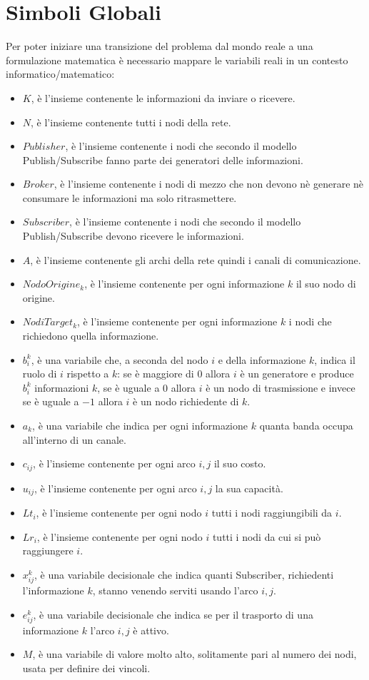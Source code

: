 \documentclass[12pt,a4paper,twoside]{report}
\begin{document}
	\section{Simboli Globali}
	Per poter iniziare una transizione del problema dal mondo reale a una formulazione matematica 
	è necessario mappare le variabili reali in un contesto informatico/matematico:
	\begin{itemize}
		\item $K$, è l'insieme contenente le informazioni da inviare o ricevere.
		\item $N$, è l'insieme contenente tutti i nodi della rete.
		\item $Publisher$, è l'insieme contenente i nodi che secondo il modello Publish/Subscribe fanno parte dei generatori delle informazioni.
		\item $Broker$, è l'insieme contenente i nodi di mezzo che non devono nè generare nè consumare le informazioni ma solo ritrasmettere.
		\item $Subscriber$, è l'insieme contenente i nodi che secondo il modello Publish/Subscribe devono ricevere le informazioni.
		\item $A$, è l'insieme contenente gli archi della rete quindi i canali di comunicazione.
		\item $NodoOrigine_k$, è l'insieme contenente per ogni informazione $k$ il suo nodo di origine.
		\item $NodiTarget_k$, è l'insieme contenente per ogni informazione $k$ i nodi che richiedono quella informazione.
		\item $b^k_i$, è una variabile che, a seconda del nodo $i$ e della informazione $k$, indica il ruolo di $i$ rispetto a $k$: se è maggiore di $0$ allora $i$ è un generatore e produce $b^k_i$ informazioni $k$, se è uguale a $0$ allora $i$ è un nodo di trasmissione e invece se è uguale a $-1$ allora $i$ è un nodo richiedente di $k$.
		\item $a_k$, è una variabile che indica per ogni informazione $k$ quanta banda occupa all'interno di un canale.
		\item $c_{ij}$, è l'insieme contenente per ogni arco $i,j$ il suo costo.
		\item $u_{ij}$, è l'insieme contenente per ogni arco $i,j$ la sua capacità.
		\item $Lt_i$, è l'insieme contenente per ogni nodo $i$ tutti i nodi raggiungibili da $i$.
		\item $Lr_i$, è l'insieme contenente per ogni nodo $i$ tutti i nodi da cui si può raggiungere $i$.
		\item $x^k_{ij}$, è una variabile decisionale che indica quanti Subscriber, richiedenti l'informazione $k$, stanno venendo serviti usando l'arco $i,j$.
		\item $e^k_{ij}$, è una variabile decisionale che indica se per il trasporto di una informazione $k$ l'arco $i,j$ è attivo.
		\item $M$, è una variabile di valore molto alto, solitamente pari al numero dei nodi, usata per definire dei vincoli.
	\end{itemize}
\end{document}
